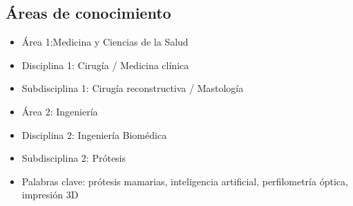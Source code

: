 \documentclass[12pt,a4paper]{article}
\begin{document}
\subsection{Áreas de conocimiento}
\begin{itemize}
    \item Área 1:Medicina y Ciencias de la Salud
    \item Disciplina 1: Cirugía / Medicina clínica
    \item Subdisciplina 1: Cirugía reconstructiva / Mastología
    \item Área 2: Ingeniería
    \item Disciplina 2: Ingeniería Biomédica
    \item Subdisciplina 2: Prótesis
    \item Palabras clave:  prótesis mamarias, inteligencia artificial, perfilometría óptica, impresión 3D
\end{itemize}
\end{document}
